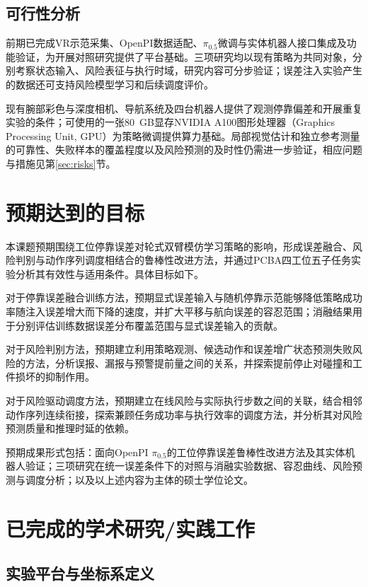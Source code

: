 \subsection{可行性分析}

前期已完成VR示范采集、OpenPI数据适配、\(\pi_{0.5}\)微调与实体机器人接口集成及功能验证，为开展对照研究提供了平台基础。三项研究均以现有策略为共同对象，分别考察状态输入、风险表征与执行时域，研究内容可分步验证；误差注入实验产生的数据还可支持风险模型学习和后续调度评价。

现有腕部彩色与深度相机、导航系统及四台机器人提供了观测停靠偏差和开展重复实验的条件；可使用的一张80~GB显存NVIDIA A100图形处理器（Graphics Processing Unit, GPU）为策略微调提供算力基础。局部视觉估计和独立参考测量的可靠性、失败样本的覆盖程度以及风险预测的及时性仍需进一步验证，相应问题与措施见第\ref{sec:risks}节。

\section{预期达到的目标}

本课题预期围绕工位停靠误差对轮式双臂模仿学习策略的影响，形成误差融合、风险判别与动作序列调度相结合的鲁棒性改进方法，并通过PCBA四工位五子任务实验分析其有效性与适用条件。具体目标如下。

对于停靠误差融合训练方法，预期显式误差输入与随机停靠示范能够降低策略成功率随注入误差增大而下降的速度，并扩大平移与航向误差的容忍范围；消融结果用于分别评估训练数据误差分布覆盖范围与显式误差输入的贡献。

对于风险判别方法，预期建立利用策略观测、候选动作和误差增广状态预测失败风险的方法，分析误报、漏报与预警提前量之间的关系，并探索提前停止对碰撞和工件损坏的抑制作用。

对于风险驱动调度方法，预期建立在线风险与实际执行步数之间的关联，结合相邻动作序列连续衔接，探索兼顾任务成功率与执行效率的调度方法，并分析其对风险预测质量和推理时延的依赖。

预期成果形式包括：面向OpenPI \(\pi_{0.5}\)的工位停靠误差鲁棒性改进方法及其实体机器人验证；三项研究在统一误差条件下的对照与消融实验数据、容忍曲线、风险预测与调度分析；以及以上述内容为主体的硕士学位论文。

\section{已完成的学术研究/实践工作}
\label{sec:completed}

\subsection{实验平台与坐标系定义}

